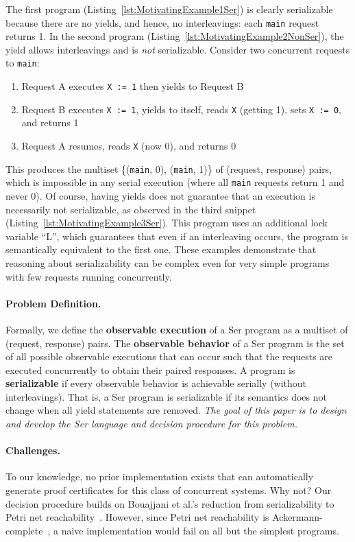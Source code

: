 %
The first program (Listing~\ref{lst:MotivatingExample1Ser}) is clearly serializable because there are no yields, and hence, no interleavings: each \texttt{main} request returns 1.
In the second program (Listing~\ref{lst:MotivatingExample2NonSer}), the yield allows interleavings and is \emph{not} serializable. Consider two concurrent requests to \texttt{main}:
\begin{enumerate}
\item Request A executes \texttt{X := 1} then yields to Request B
\item Request B executes \texttt{X := 1}, yields to itself, reads \texttt{X} (getting 1), sets \texttt{X := 0}, and returns 1
\item Request A resumes, reads \texttt{X} (now 0), and returns 0
\end{enumerate}
This produces the multiset \{(\texttt{main}, 0), (\texttt{main}, 1)\} of (request, response) pairs, which is impossible in any serial execution (where all \texttt{main} requests return 1 and never 0).
Of course, having yields does not guarantee that an execution is necessarily not serializable, as observed in the third snippet (Listing~\ref{lst:MotivatingExample3Ser}). This program uses an additional lock variable ``L'', which guarantees that even if an interleaving occurs, the program is semantically equivalent to the first one.
%
These examples demonstrate that reasoning about serializability can be complex even for very simple programs with few requests running concurrently.

\paragraph{Problem Definition.}
Formally, we define the \textbf{observable execution} of a Ser program as a multiset of (request, response) pairs. The \textbf{observable behavior} of a Ser program is the set of all possible observable executions that can occur such that the requests are executed concurrently to obtain their paired responses.
A program is \textbf{serializable} if every observable behavior is achievable serially (without interleavings). That is, a Ser program is serializable if its semantics does not change when all yield statements are removed.
%
\emph{The goal of this paper is to design and develop the Ser language and decision procedure for this problem.}

\paragraph{Challenges.}
To our knowledge, no prior implementation exists that can automatically generate proof certificates for this class of concurrent systems.
Why not?
Our decision procedure builds on Bouajjani et al.'s reduction from serializability to Petri net reachability~\cite{BoEmEnHa13}. However, since Petri net reachability is Ackermann-complete~\cite{CzWo22}, a naive implementation would fail on all but the simplest programs. 

